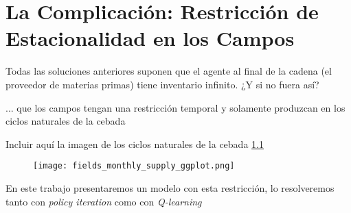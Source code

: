 \chapter{La Complicaci\'on: Restricci\'on de Estacionalidad en los Campos}

Todas las soluciones anteriores suponen que el agente al final de la cadena (el proveedor de materias primas) tiene inventario infinito. ¿Y si no fuera as\'i?

... que los campos tengan una restricci\'on temporal y solamente produzcan en los ciclos naturales de la cebada

Incluir aqu\'i la imagen de los ciclos naturales de la cebada \ref{fields}

\begin{figure}[h]
\caption{ }
\label{fields}
\texttt{[image: fields\_monthly\_supply\_ggplot.png]}
\centering
\end{figure}


En este trabajo presentaremos un modelo con esta restricci\'on, lo resolveremos tanto con \textit{policy iteration} como con \textit{Q-learning}
